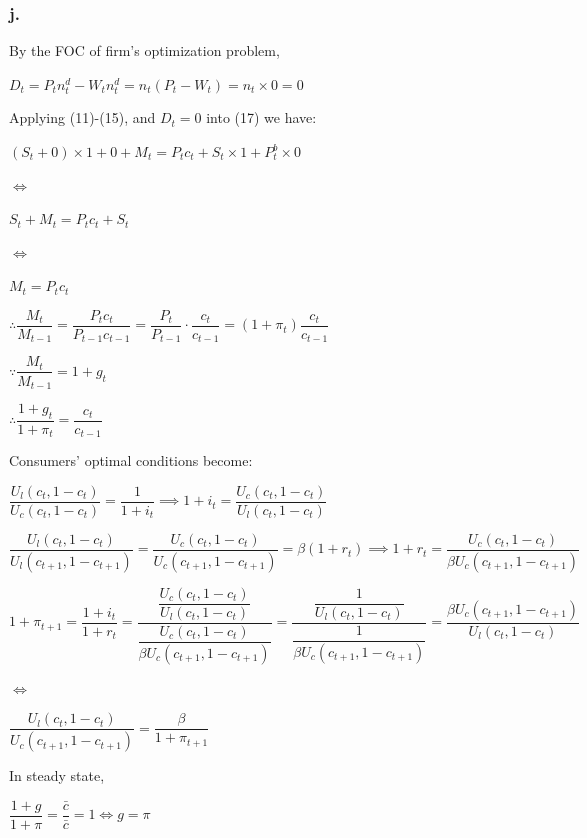 \documentclass{article}
\begin{document}
\subsubsection*{\textrm{j.}}

By the FOC of firm's optimization problem,

$D_{t}=P_{t}n^{d}_{t}-W_{t}n^{d}_{t}=n_{t}\left(P_{t}-W_{t}\right)=n_{t}\times0=0$

Applying (11)-(15), and $D_{t}=0$ into (17) we have:

$\left(S_{t}+0\right)\times1+0+M_{t}=P_{t}c_{t}+S_{t}\times1+P^{b}_{t}\times0$

$\iff$

$S_{t}+M_{t}=P_{t}c_{t}+S_{t}$

$\iff$

$M_{t}=P_{t}c_{t}$

$\therefore \dfrac{M_{t}}{M_{t-1}}=\dfrac{P_{t}c_{t}}{P_{t-1}c_{t-1}}=\dfrac{P_{t}}{P_{t-1}}\cdot\dfrac{c_{t}}{c_{t-1}}=\left(1+\pi_{t}\right)\dfrac{c_{t}}{c_{t-1}}$

$\because \dfrac{M_{t}}{M_{t-1}}=1+g_{t}$

$\therefore\dfrac{1+g_{t}}{1+\pi_{t}}=\dfrac{c_{t}}{c_{t-1}}$

Consumers' optimal conditions become:

$\dfrac{U_{l}\left(c_{t},1-c_{t}\right)}{U_{c}\left(c_{t},1-c_{t}\right)}=\dfrac{1}{1+i_{t}}\implies1+i_{t}=\dfrac{U_{c}\left(c_{t},1-c_{t}\right)}{U_{l}\left(c_{t},1-c_{t}\right)}$

$\dfrac{U_{l}\left(c_{t},1-c_{t}\right)}{U_{l}\left(c_{t+1},1-c_{t+1}\right)}=\dfrac{U_{c}\left(c_{t},1-c_{t}\right)}{U_{c}\left(c_{t+1},1-c_{t+1}\right)}=\beta\left(1+r_{t}\right)\implies1+r_{t}=\dfrac{U_{c}\left(c_{t},1-c_{t}\right)}{\beta U_{c}\left(c_{t+1},1-c_{t+1}\right)}$

$1+\pi_{t+1}=\dfrac{1+i_{t}}{1+r_{t}}=\dfrac{\dfrac{U_{c}\left(c_{t},1-c_{t}\right)}{U_{l}\left(c_{t},1-c_{t}\right)}}{\dfrac{U_{c}\left(c_{t},1-c_{t}\right)}{\beta U_{c}\left(c_{t+1},1-c_{t+1}\right)}}=\dfrac{\dfrac{1}{U_{l}\left(c_{t},1-c_{t}\right)}}{\dfrac{1}{\beta U_{c}\left(c_{t+1},1-c_{t+1}\right)}}=\dfrac{\beta U_{c}\left(c_{t+1},1-c_{t+1}\right)}{U_{l}\left(c_{t},1-c_{t}\right)}$

$\iff$

$\boxed{\dfrac{U_{l}\left(c_{t},1-c_{t}\right)}{U_{c}\left(c_{t+1},1-c_{t+1}\right)}=\dfrac{\beta}{1+\pi_{t+1}}}$

In steady state, 

$\dfrac{1+g}{1+\pi}=\dfrac{\bar{c}}{\bar{c}}=1\iff g=\pi$
\end{document}
